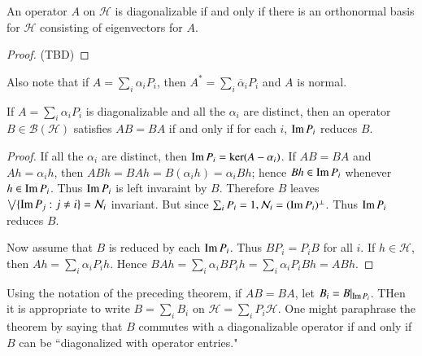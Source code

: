 \begin{prop}
    An operator $A$ on $\mathscr{H}$ is diagonalizable if and only if there is an orthonormal basis for $\mathscr{H}$ consisting of eigenvectors for $A$.
\end{prop}
\begin{proof}
    (TBD)
\end{proof}

Also note that if $A = \sum_i\alpha_iP_i$, then $A^* = \sum_i\overline{\alpha}_iP_i$ and $A$ is normal.

\begin{thm}\label{thm:diag}
    If $A = \sum_i\alpha_iP_i$ is diagonalizable and all the $\alpha_i$ are distinct, then an operator $B \in \mathscr{B}(\mathscr{H})$ satisfies $AB = BA$ if and only if for each $i$, $\operatorname{Im} P_i$ reduces $B$.
\end{thm}
\begin{proof}
    If all the $\alpha_i$ are distinct, then $\operatorname{Im} P_i = \ker(A-\alpha_i)$. If $AB = BA$ and $Ah = \alpha_ih$, then $ABh = BAh = B(\alpha_ih) = \alpha_iBh$; hence $Bh \in \operatorname{Im} P_i$ whenever $h \in \operatorname{Im} P_i$. Thus $\operatorname{Im} P_i$ is left invaraint by $B$. Therefore $B$ leaves $\bigvee\{ \operatorname{Im} P_j:j \neq i\} = \mathcal{N}_i$ invariant. But since $\sum_iP_i = 1,\mathcal{N}_i = (\operatorname{Im} P_i)^{\perp}$. Thus $\operatorname{Im} P_i$ reduces $B$.

    Now assume that $B$ is reduced by each $\operatorname{Im} P_i$. Thus $BP_i = P_iB$ for all $i$. If $h \in \mathscr{H}$, then $Ah = \sum_i\alpha_iP_ih$. Hence $BAh = \sum_i\alpha_iBP_ih = \sum_i\alpha_iP_iBh = ABh$.
\end{proof}

Using the notation of the preceding theorem, if $AB = BA$, let $B_i = B\vert_{\operatorname{Im} P_i}$. THen it is appropriate to write $B = \sum_iB_i$ on $\mathscr{H} = \sum_iP_i\mathscr{H}$. One might paraphrase the theorem by saying that $B$ commutes with a diagonalizable operator if and only if $B$ can be ``diagonalized with operator entries."

